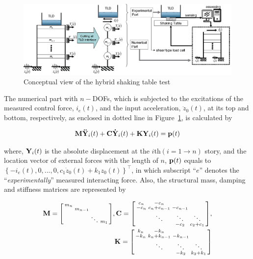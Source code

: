 \begin{figure}[ht]
\centering
\includegraphics[width=\textwidth] {figure/3-1.eps}
\caption{Conceptual view of the hybrid shaking table test}
\label{fig:3-1}
\end{figure}

The numerical part with $n-$DOFs, which is subjected to the excitations of the measured control force, $i_{e}(t)$, and the input acceleration, $\ddot{z}_{0}(t)$, at its top and bottom, respectively, as enclosed in dotted line in Figure~\ref{fig:3-1}, is calculated by

\begin{equation}\label{eq:3-1}
\mathbf{M}\mathbf{\ddot{Y}}_{i}(t) + \mathbf{C}\mathbf{\dot{Y}}_{i}(t) + \mathbf{K}\mathbf{Y}_{i}(t) = \mathbf{p}(t)
\end{equation}

where, $\mathbf{Y}_{i}(t)$ is the absolute displacement at the $i$th$\left(i=1\rightarrow n\right)$ story, and the location vector of external forces with the length of $n$, $\mathbf{p}(t)$  equals to $\left\{ -i_{e}(t),0,...,0,c_{1}\dot{z}_{0}(t)+k_{1}z_{0}(t)\right\}^{\top}$, in which subscript ``$e$'' denotes the ``\textit{experimentally}'' measured interacting force. Also, the structural mass, damping and stiffness matrices are represented by

\begin{equation}\label{eq:3-2}
\begin{aligned}
\mathbf{M}=\begin{bsmallmatrix}m_{n}&&&\\&m_{n-1}&&\\&&\ddots&m_{1}\end{bsmallmatrix},
\mathbf{C}=\begin{bsmallmatrix}c_{n}&-c_{n}&&\\-c_{n}&c_{n}+c_{n-1}&-c_{n-1}&\\ &\ddots&\ddots&\ddots\\&&-c_{2}&c_{2}+c_{1}\end{bsmallmatrix},\\
\mathbf{K}=\begin{bsmallmatrix}k_{n}&-k_{n}&&\\-k_{n}&k_{n}+k_{n-1}&-k_{n-1}&\\ &\ddots&\ddots&\ddots\\&&-k_{2}&k_{2}+k_{1}\end{bsmallmatrix}
\end{aligned}
\end{equation}

